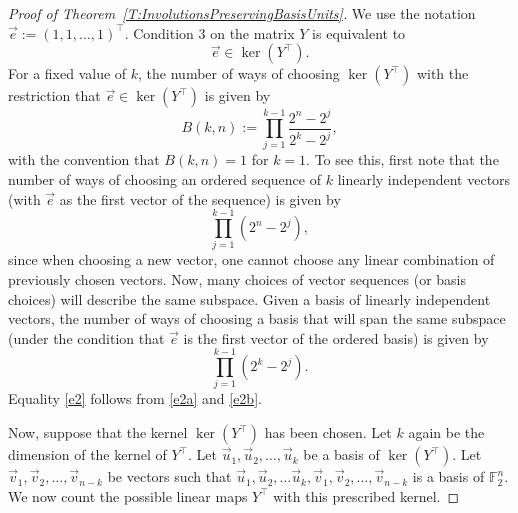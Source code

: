 \documentclass[12pt]{amsart}
\theoremstyle{plain}
\theoremstyle{definition}
\numberwithin{equation}{section}
\begin{document}
\begin{proof}[Proof of Theorem~\ref{T:InvolutionsPreservingBasisUnits}]
We use the notation $\vec{e}:=(1,1,\ldots,1)^\top$.  Condition 3 on the matrix $Y$ is equivalent to 
\[
\vec{e}\in \ker (Y^\top).
\]
For a fixed value of $k$, the number of ways of choosing $\ker (Y^\top)$ with the restriction that $\vec{e}\in \ker (Y^\top)$ is given by
\begin{equation}\label{e2}
    B(k,n):=\prod_{j=1}^{k-1}\frac{2^n-2^j}{2^k-2^j},
\end{equation}
with the convention that $B(k,n)=1$ for $k=1$. To see this, first note that the number of ways of choosing an ordered sequence of $k$ linearly independent vectors (with $\vec{e}$ as the first vector of the sequence) is given by
\begin{equation}\label{e2a}
\prod_{j=1}^{k-1}(2^n-2^j),
 \end{equation}
since when choosing a new vector, one cannot choose any linear combination of previously chosen vectors. Now, many choices of vector sequences (or basis choices) will describe the same subspace.  Given a basis of linearly independent vectors, the number of ways of choosing a basis that will span the same subspace (under the condition that $\vec{e}$ is the first vector of the ordered basis) is given by 
\begin{equation}\label{e2b}
\prod_{j=1}^{k-1}(2^k-2^j).
 \end{equation}
 Equality \eqref{e2} follows from \eqref{e2a} and \eqref{e2b}.

Now, suppose that the kernel $\ker (Y^{\top})$ has been chosen. Let $k$ again be the dimension of the kernel of $Y^{\top}$. Let $\vec{u}_1,\vec{u}_2,\ldots, \vec{u}_k$ be a basis of $\ker (Y^\top)$. Let $\vec{v}_1, \vec{v}_2,\ldots,\vec{v}_{n-k}$ be vectors such that 
$\vec{u}_1,\vec{u}_2,\ldots \vec{u}_k,\vec{v}_1, \vec{v}_2,\ldots,\vec{v}_{n-k}$ is a basis of $\mathbb F_2^n$. We now count the possible linear maps $Y^\top$ with this prescribed kernel.


\end{proof}
\end{document}
